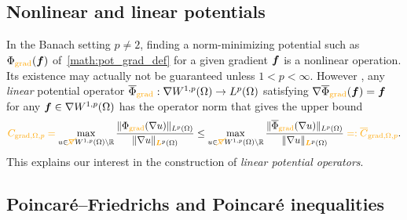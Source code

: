 \documentclass[10pt,letterpaper]{article}
\newcommand\cye[1]{%
  \protect\leavevmode
  \begingroup
    \color{red!35!yellow}%
    #1%
  \endgroup
}
\begin{document}
\subsection{Nonlinear and linear potentials}

In the Banach setting $p \neq 2$, finding a norm-minimizing potential \cye{such as $\Phi_{\cye{\grad}}( \bff )$ of~\eqref{math:pot_grad_def} for a given gradient $\bm{f}$} is a nonlinear operation. Its existence \cye{may actually} not be guaranteed unless $1 < p < \infty$. 
\cye{However}, any \textit{linear} potential operator $\overline\Phi_{\cye{\grad}} : \nabla W^{1,p}(\Omega) \rightarrow L^{p}(\Omega)$
satisfying $\nabla \overline\Phi_{\cye{\grad}}( \bff ) = \bff$ for any $\bm{f} \in \nabla W^{1,p}(\Omega)$ \cye{has the} operator norm that \cye{gives} the \cye{upper} bound 
\begin{align}\label{math:PF_P}
    \cye{C_{\grad,\Omega,p} = } \max\limits_{ u \in \cye{\cancel{\nabla}} W^{1,p}(\Omega) \setminus \bbR } 
    \frac{ \| \Phi_{\cye{\grad}}(\nabla u) \|_{L^{p}(\Omega)} }{ \| \nabla u \|_{\cye{\bfL}^{p}(\Omega)} }
    \leq 
    \max\limits_{ u \in \cye{\cancel{\nabla}} W^{1,p}(\Omega) \setminus \bbR } 
    \frac{ \| \overline\Phi_{\cye{\grad}}(\nabla u) \|_{L^{p}(\Omega)} }{ \| \nabla u \|_{\cye{\bfL}^{p}(\Omega)} } \cye{=: \overline C_{\grad,\Omega,p}}
    .
\end{align}
\cye{This explains our interest in the construction of} {\em linear potential operators}.

\subsection{Poincar\'e--Friedrichs and Poincar\'e inequalities}
\end{document}
